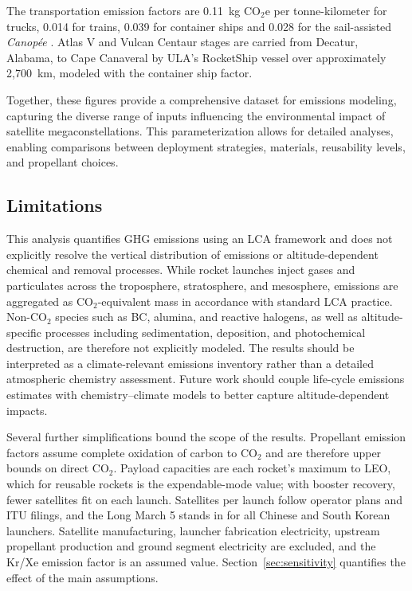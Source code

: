 \documentclass[pdflatex,sn-mathphys-num]{sn-jnl}
\theoremstyle{thmstyleone}%
\theoremstyle{thmstyletwo}%
\theoremstyle{thmstylethree}%
\begin{document}
The transportation emission factors are 0.11~kg CO$_2$e per tonne-kilometer for trucks, 0.014 for trains, 0.039 for container ships and 0.028 for the sail-assisted \textit{Canop\'ee} \citep{cbo_emissions_nodate}. Atlas V and Vulcan Centaur stages are carried from Decatur, Alabama, to Cape Canaveral by ULA's RocketShip vessel over approximately 2,700~km, modeled with the container ship factor.

Together, these figures provide a comprehensive dataset for emissions modeling, capturing the diverse range of inputs influencing the environmental impact of satellite megaconstellations. This parameterization allows for detailed analyses, enabling comparisons between deployment strategies, materials, reusability levels, and propellant choices.

\subsection{Limitations}
This analysis quantifies GHG emissions using an LCA framework and does not explicitly resolve the vertical distribution of emissions or altitude-dependent chemical and removal processes. While rocket launches inject gases and particulates across the troposphere, stratosphere, and mesosphere, emissions are aggregated as CO$_2$-equivalent mass in accordance with standard LCA practice. Non-CO$_2$ species such as BC, alumina, and reactive halogens, as well as altitude-specific processes including sedimentation, deposition, and photochemical destruction, are therefore not explicitly modeled. The results should be interpreted as a climate-relevant emissions inventory rather than a detailed atmospheric chemistry assessment. Future work should couple life-cycle emissions estimates with chemistry–climate models to better capture altitude-dependent impacts.

Several further simplifications bound the scope of the results. Propellant emission factors assume complete oxidation of carbon to CO$_2$ and are therefore upper bounds on direct CO$_2$. Payload capacities are each rocket's maximum to LEO, which for reusable rockets is the expendable-mode value; with booster recovery, fewer satellites fit on each launch. Satellites per launch follow operator plans and ITU filings, and the Long March 5 stands in for all Chinese and South Korean launchers. Satellite manufacturing, launcher fabrication electricity, upstream propellant production and ground segment electricity are excluded, and the Kr/Xe emission factor is an assumed value. Section~\ref{sec:sensitivity} quantifies the effect of the main assumptions.
\end{document}
